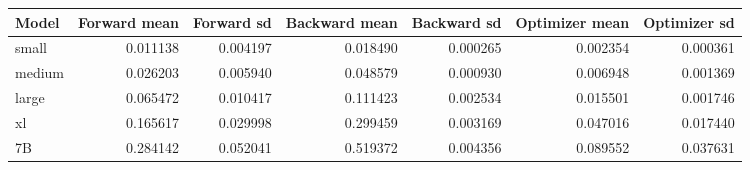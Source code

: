 \begin{tabular}{lrrrrrr}
\toprule
Model & Forward mean & Forward sd & Backward mean & Backward sd & Optimizer mean & Optimizer sd \\
\midrule
small & 0.011138 & 0.004197 & 0.018490 & 0.000265 & 0.002354 & 0.000361 \\
medium & 0.026203 & 0.005940 & 0.048579 & 0.000930 & 0.006948 & 0.001369 \\
large & 0.065472 & 0.010417 & 0.111423 & 0.002534 & 0.015501 & 0.001746 \\
xl & 0.165617 & 0.029998 & 0.299459 & 0.003169 & 0.047016 & 0.017440 \\
7B & 0.284142 & 0.052041 & 0.519372 & 0.004356 & 0.089552 & 0.037631 \\
\bottomrule
\end{tabular}
